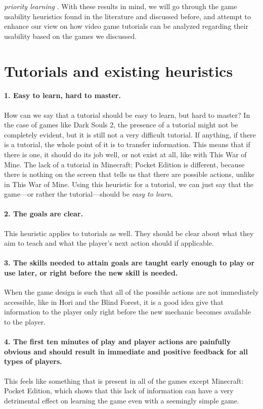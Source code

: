 \textit{priority learning} \cite{Bycer2016}. With these results in mind, we will go through the game usability heuristics found in the literature and discussed before, and attempt to enhance our view on how video game tutorials can be analyzed regarding their usability based on the games we discussed.

\section{Tutorials and existing heuristics}
\paragraph{1. Easy to learn, hard to master.} How can we say that a tutorial should be easy to learn, but hard to master? In the case of games like Dark Souls 2, the presence of a tutorial might not be completely evident, but it is still not a very difficult tutorial. If anything, if there is a tutorial, the whole point of it is to transfer information. This means that if there is one, it should do its job well, or not exist at all, like with This War of Mine. The lack of a tutorial in Minecraft: Pocket Edition is different, because there is nothing on the screen that tells us that there are possible actions, unlike in This War of Mine. Using this heuristic for a tutorial, we can just say that the game---or rather the tutorial---should be \textit{easy to learn}.

\paragraph{2. The goals are clear. } This heuristic applies to tutorials as well. They should be clear about what they aim to teach and what the player's next action should if applicable.

\paragraph{3. The skills needed to attain goals are taught early enough to play or use later, or right before the new skill is needed.} When the game design is such that all of the possible actions are not immediately accessible, like in Hori and the Blind Forest, it is a good idea give that information to the player only right before the new mechanic becomes available to the player. 

\paragraph{4. The first ten minutes of play and player actions are painfully obvious and should result in immediate and positive feedback for all types of players. } This feels like something that is present in all of the games except Minecraft: Pocket Edition, which shows that this lack of information can have a very detrimental effect on learning the game even with a seemingly simple game.

